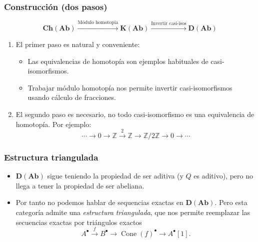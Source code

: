 \documentclass[12pt]{beamer}
\begin{document}
\begin{frame}
  \frametitle{Construcción (dos pasos)}
  \[ \mathbf{Ch}(\mathbf{Ab}) \xrightarrow{\text{Módulo homotopía}} \mathbf{K}(\mathbf{Ab}) \xrightarrow{\text{Invertir casi-isos}} \mathbf{D}(\mathbf{Ab}) \]
  \pause
  \begin{enumerate}
    \item El primer paso es natural y conveniente:
      \begin{itemize}
        \item Las equivalencias de homotopía son ejemplos habituales de casi-isomorfismos.
          \pause
        \item Trabajar módulo homotopía nos permite invertir casi-isomorfismos usando cálculo de fracciones.
      \end{itemize}
      \pause
    \item El segundo paso es necesario, no todo casi-isomorfismo es una equivalencia de homotopía.
      Por ejemplo:
      \[ \cdots \to 0 \to \mathbb{Z} \xrightarrow{2} \mathbb{Z} \to \mathbb{Z}/2\mathbb{Z} \to 0 \to \cdots \]
  \end{enumerate}
\end{frame}

\begin{frame}
  \frametitle{Estructura triangulada}
  \begin{itemize}
    \item $\mathbf{D}(\mathbf{Ab})$ sigue teniendo la propiedad de ser aditiva (y $Q$ es aditivo), pero no llega a tener la propiedad de ser abeliana.
      \pause

    \item Por tanto no podemos hablar de sequencias exactas en $\mathbf{D}(\mathbf{Ab})$.
      \pause
      Pero esta categoría admite una \textit{estructura triangulada}, que nos permite reemplazar las secuencias exactas por triángulos exactos
      \[ A^{\bullet} \xrightarrow{f} B^{\bullet} \to \operatorname{Cone}(f)^{\bullet} \to A^{\bullet}[1]. \]
  \end{itemize}
\end{frame}
\end{document}
